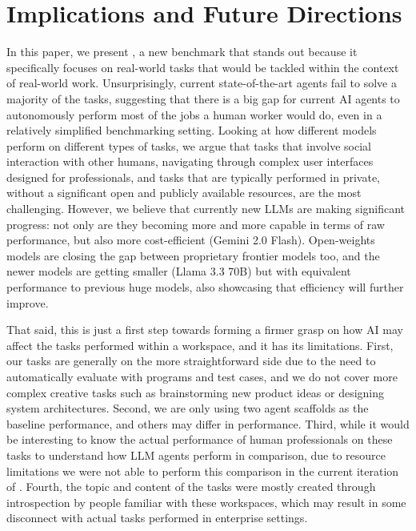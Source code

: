 \documentclass{article}
\begin{document}
\section{Implications and Future Directions}
\label{sec:future_directions}
\vspace{-1mm}
In this paper, we present \tac, a new benchmark that stands out because it specifically focuses on real-world tasks that would be tackled within the context of real-world work.
Unsurprisingly, current state-of-the-art agents fail to solve a majority of the tasks, suggesting that there is a big gap for current AI agents to autonomously perform most of the jobs a human worker would do, even in a relatively simplified benchmarking setting.
Looking at how different models perform on different types of tasks, we argue that tasks that involve social interaction with other humans, navigating through complex user interfaces designed for professionals, and tasks that are typically performed in private, without a significant open and publicly available resources, are the most challenging.
However, we believe that currently new LLMs are making significant progress: not only are they becoming more and more capable in terms of raw performance, but also more cost-efficient (\eg Gemini 2.0 Flash).
Open-weights models are closing the gap between proprietary frontier models too, and the newer models are getting smaller (\eg Llama 3.3 70B) but with equivalent performance to previous huge models, also showcasing that efficiency will further improve.

That said, this is just a first step towards forming a firmer grasp on how AI may affect the tasks performed within a workspace, and it has its limitations.
First, our tasks are generally on the more straightforward side due to the need to automatically evaluate with programs and test cases, and we do not cover more complex creative tasks such as brainstorming new product ideas or designing system architectures.
Second, we are only using two agent scaffolds as the baseline performance, and others may differ in performance.
Third, while it would be interesting to know the actual performance of human professionals on these tasks to understand how LLM agents perform in comparison, due to resource limitations we were not able to perform this comparison in the current iteration of \tac.
Fourth, the topic and content of the tasks were mostly created through introspection by people familiar with these workspaces, which may result in some disconnect with actual tasks performed in enterprise settings.
\end{document}
